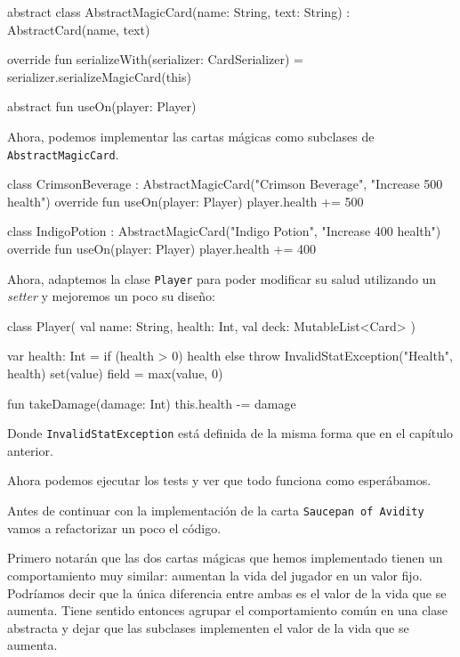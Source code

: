   \begin{kotlin}
    abstract class AbstractMagicCard(name: String, text: String) :
        AbstractCard(name, text) {
      override fun serializeWith(serializer: CardSerializer) =
        serializer.serializeMagicCard(this)

      abstract fun useOn(player: Player)
    }
  \end{kotlin}

  Ahora, podemos implementar las cartas mágicas como subclases de \texttt{AbstractMagicCard}.

  \begin{kotlin}
    class CrimsonBeverage :
        AbstractMagicCard("Crimson Beverage", "Increase 500 health") {
      override fun useOn(player: Player) {
        player.health += 500
      }
    }
  \end{kotlin}

  \begin{kotlin}
    class IndigoPotion :
        AbstractMagicCard("Indigo Potion", "Increase 400 health") {
      override fun useOn(player: Player) {
        player.health += 400
      }
    }
  \end{kotlin}

  Ahora, adaptemos la clase \texttt{Player} para poder modificar su salud utilizando un 
  \textit{setter} y mejoremos un poco su diseño:

  \begin{kotlin}
    class Player(
      val name: String,
      health: Int,
      val deck: MutableList<Card>
    ) {
      var health: Int =
        if (health > 0) health else throw InvalidStatException("Health", health)
        set(value) {
          field = max(value, 0)
        }

      fun takeDamage(damage: Int) {
        this.health -= damage
      }
    }
  \end{kotlin}

  Donde \texttt{InvalidStatException} está definida de la misma forma que en el capítulo anterior.

  Ahora podemos ejecutar los tests y ver que todo funciona como esperábamos.

  Antes de continuar con la implementación de la carta \texttt{Saucepan of Avidity} vamos a
  refactorizar un poco el código.

  Primero notarán que las dos cartas mágicas que hemos implementado tienen un comportamiento
  muy similar: aumentan la vida del jugador en un valor fijo.
  Podríamos decir que la única diferencia entre ambas es el valor de la vida que se aumenta.
  Tiene sentido entonces agrupar el comportamiento común en una clase abstracta y dejar que
  las subclases implementen el valor de la vida que se aumenta.

